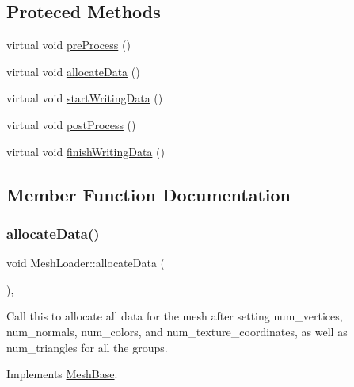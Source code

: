 \subsection*{Proteced Methods}
\begin{DoxyCompactItemize}
\item 
virtual void \hyperlink{class_mesh_loader_ad9c636920b31629f1c271b20a5fdc29b}{pre\+Process} ()
\item 
virtual void \hyperlink{class_mesh_loader_a8bdf8e0894e147be8d3e287f46feff6a}{allocate\+Data} ()
\item 
virtual void \hyperlink{class_mesh_loader_a18379e41707d8127947aa17a622d2807}{start\+Writing\+Data} ()
\item 
virtual void \hyperlink{class_mesh_loader_a83a3c78a6c2df1087c9f9e28c63e6d51}{post\+Process} ()
\item 
virtual void \hyperlink{class_mesh_loader_a65847db267f07f637deab0889c283bfa}{finish\+Writing\+Data} ()
\end{DoxyCompactItemize}


\subsection{Member Function Documentation}
\mbox{\label{class_mesh_loader_a8bdf8e0894e147be8d3e287f46feff6a}} 
\subsubsection{\texorpdfstring{allocate\+Data()}{allocateData()}}
{\footnotesize\ttfamily void Mesh\+Loader\+::allocate\+Data (\begin{DoxyParamCaption}{ }\end{DoxyParamCaption})\hspace{0.3cm}{\ttfamily [protected]}, {\ttfamily [virtual]}}

Call this to allocate all data for the mesh after setting num\+\_\+vertices, num\+\_\+normals, num\+\_\+colors, and num\+\_\+texture\+\_\+coordinates, as well as num\+\_\+triangles for all the groups. 

Implements \hyperlink{class_mesh_base_a30c0ef8b3faabc9b41520b85dd9413bb}{Mesh\+Base}.

\mbox{\label{class_mesh_loader_a65847db267f07f637deab0889c283bfa}} 

